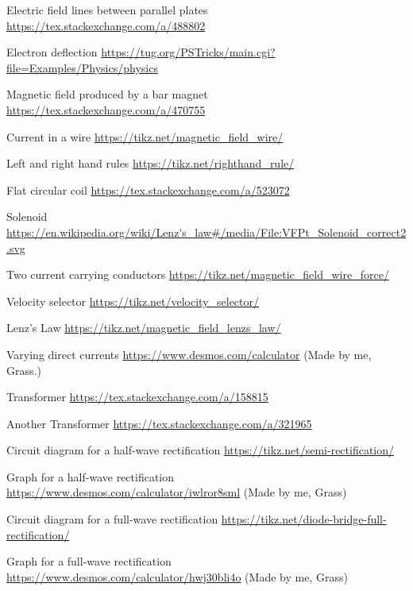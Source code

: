 \documentclass[oneside]{book}
\begin{document}
\begin{enumerate}[label={[\arabic*]}]
    \item\label{Electric field lines between parallel plates} Electric field lines between parallel plates \url{https://tex.stackexchange.com/a/488802}
    \item\label{Electron deflection} Electron deflection \url{https://tug.org/PSTricks/main.cgi?file=Examples/Physics/physics}
    \item\label{Magnetic field produced by a bar magnet} Magnetic field produced by a bar magnet \url{https://tex.stackexchange.com/a/470755} 
    \item\label{Current in a wire} Current in a wire \url{https://tikz.net/magnetic_field_wire/}
    \item\label{Left and right hand rules} Left and right hand rules \url{https://tikz.net/righthand_rule/}
    \item\label{Flat circular coil} Flat circular coil \url{https://tex.stackexchange.com/a/523072}
    \item\label{Solenoid} Solenoid \url{https://en.wikipedia.org/wiki/Lenz's_law#/media/File:VFPt_Solenoid_correct2.svg}
    \item\label{Two current carrying conductors} Two current carrying conductors \url{https://tikz.net/magnetic_field_wire_force/}
    \item\label{Velocity selector} Velocity selector \url{https://tikz.net/velocity_selector/}
    \item\label{Lenz's Law} Lenz's Law \url{https://tikz.net/magnetic_field_lenzs_law/}
    \item\label{Varying direct current} Varying direct currents \url{https://www.desmos.com/calculator} (Made by me, Grass.)
    \item\label{Transformer} Transformer \url{https://tex.stackexchange.com/a/158815}
    \item\label{Another Transformer} Another Transformer \url{https://tex.stackexchange.com/a/321965}
    \item\label{Half-Wave-Recification-Circuit} Circuit diagram for a half-wave rectification \url{https://tikz.net/semi-rectification/}
    \item\label{Half-Wave-Recification-Graph} Graph for a half-wave rectification \url{https://www.desmos.com/calculator/iwlror8sml} (Made by me, Grass)
    \item\label{Full-Wave-Rectificaion-Circuit} Circuit diagram for a full-wave rectification \url{https://tikz.net/diode-bridge-full-rectification/}
    \item\label{Full-Wave-Rectification-Graph} Graph for a full-wave rectification \url{https://www.desmos.com/calculator/hwj30bli4o} (Made by me, Grass)

\end{enumerate}
\end{document}
